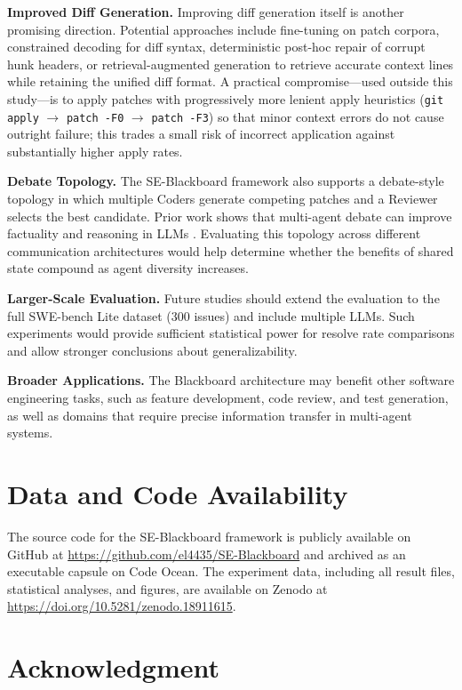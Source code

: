 \documentclass{ieeeaccess}
\begin{document}
\textbf{Improved Diff Generation.} Improving diff generation itself is another promising direction. Potential approaches include fine-tuning on patch corpora, constrained decoding for diff syntax, deterministic post-hoc repair of corrupt hunk headers, or retrieval-augmented generation \cite{lewis2020retrieval} to retrieve accurate context lines while retaining the unified diff format. A practical compromise---used outside this study---is to apply patches with progressively more lenient apply heuristics (\texttt{git apply} $\rightarrow$ \texttt{patch -F0} $\rightarrow$ \texttt{patch -F3}) so that minor context errors do not cause outright failure; this trades a small risk of incorrect application against substantially higher apply rates.

\textbf{Debate Topology.} The SE-Blackboard framework also supports a debate-style topology in which multiple Coders generate competing patches and a Reviewer selects the best candidate. Prior work shows that multi-agent debate can improve factuality and reasoning in LLMs \cite{du2024improving}. Evaluating this topology across different communication architectures would help determine whether the benefits of shared state compound as agent diversity increases.

\textbf{Larger-Scale Evaluation.} Future studies should extend the evaluation to the full SWE-bench Lite dataset (300 issues) and include multiple LLMs. Such experiments would provide sufficient statistical power for resolve rate comparisons and allow stronger conclusions about generalizability.

\textbf{Broader Applications.} The Blackboard architecture may benefit other software engineering tasks, such as feature development, code review, and test generation, as well as domains that require precise information transfer in multi-agent systems.

\section*{Data and Code Availability}

The source code for the SE-Blackboard framework is publicly available on GitHub at \url{https://github.com/el4435/SE-Blackboard} and archived as an executable capsule on Code Ocean. The experiment data, including all result files, statistical analyses, and figures, are available on Zenodo at \url{https://doi.org/10.5281/zenodo.18911615}.

\section*{Acknowledgment}
\end{document}
